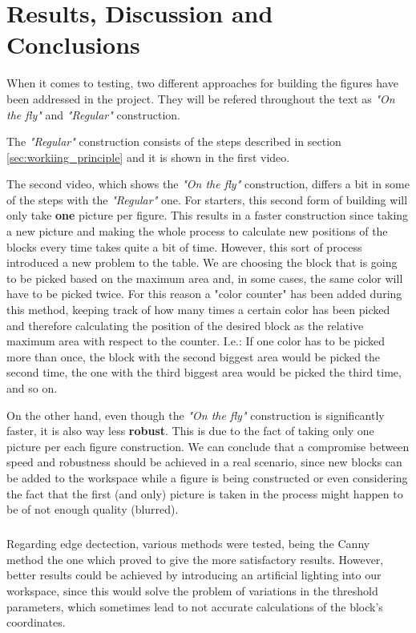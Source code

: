 \chapter{Results, Discussion and Conclusions}\label{ch:conclusion}

When it comes to testing, two different approaches for building the figures have been addressed in the project. They will be refered throughout the text as \textit{"On the fly"} and \textit{"Regular"} construction.

The \textit{"Regular"} construction consists of the steps described in section \ref{sec:workiing_principle} and it is shown in the first video. 

The second video, which shows the \textit{"On the fly"} construction, differs a bit in some of the steps with the \textit{"Regular"} one.
For starters, this second form of building will only take \textbf{one} picture per figure. This results in a faster construction since taking a new picture and making the whole process to calculate new positions of the blocks every time takes quite a bit of time.
However, this sort of process introduced a new problem to the table. We are choosing the block that is going to be picked based on the maximum area and, in some cases, the same color will have to be picked twice.
For this reason a "color counter" has been added during this method, keeping track of how many times a certain color has been picked and therefore calculating the position of the desired block as the relative maximum area with respect to the counter. I.e.: If one color has to be picked more than once, the block with the second biggest area would be picked the second time, the one with the third biggest area would be picked the third time, and so on. 

On the other hand, even though the \textit{"On the fly"} construction is significantly faster, it is also way less \textbf{robust}. This is due to the fact of taking only one picture per each figure construction. 
We can conclude that a compromise between speed and robustness should be achieved in a real scenario, since new blocks can be added to the workspace while a figure is being constructed or even considering the fact that the first (and only) picture is taken in the process might happen to be of not enough quality (blurred).

\paragraph{} Regarding edge dectection, various methods were tested, being the Canny method the one which proved to give the more satisfactory results. 
However, better results could be achieved by introducing an artificial lighting into our workspace, since this would solve the problem of variations in the threshold parameters, which sometimes lead to not accurate calculations of the block's coordinates.

